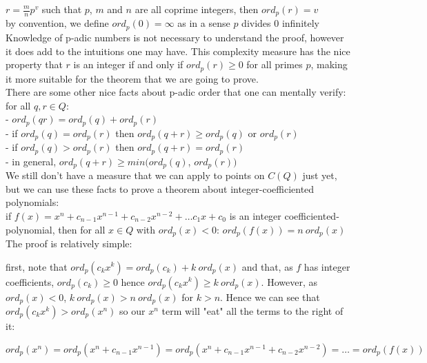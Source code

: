 \documentclass{article}
\begin{document}
$r = \frac{m}{n}p^v$ such that $p$, $m$ and $n$ are all coprime integers, then $ord_p(r) = v$\\

by convention, we define $ord_p(0) = \infty$ as in a sense $p$ divides $0$ infinitely\\

Knowledge of p-adic numbers is not necessary to understand the proof, however it does add to the intuitions one may have. This complexity measure has the nice property that $r$ is an integer if and only if $ord_p(r) \geq 0$ for all primes $p$, making it more suitable for the theorem that we are going to prove. \\

There are some other nice facts about p-adic order that one can mentally verify:\\

for all $q, r \in Q$:\\

- $ord_p(qr) = ord_p(q) + ord_p(r)$\\

- if $ord_p(q) = ord_p(r)$ then $ord_p(q + r)  \geq ord_p(q)$ or $ord_p(r)$\\

- if $ord_p(q) > ord_p(r)$ then $ord_p(q + r) = ord_p(r)$\\

- in general, $ord_p(q + r) \geq min(ord_p(q)$, $ord_p(r))$\\

We still don't have a measure that we can apply to points on $C(Q)$ just yet, but we can use these facts to prove a theorem about integer-coefficiented polynomials:\\

if $f(x) = x^n + c_{n-1}x^{n-1} + c_{n-2}x^{n-2} + \dots c_1 x + c_0$ is an integer coefficiented-polynomial, then for all $x \in Q$ with $ord_p(x) < 0$: $ord_p(f(x)) = n \ ord_p(x)$\\

The proof is relatively simple:

first, note that $ord_p(c_k x^k) = ord_p(c_k) + k \ ord_p(x)$ and that, as $f$ has integer coefficients, $ord_p(c_k) \geq 0$ hence $ord_p(c_k x^k) \geq k \ ord_p(x)$. However, as $ord_p(x) < 0$, $k \ ord_p(x) > n \ ord_p(x)$ for $k > n$. Hence we can see that $ord_p(c_k x^k) > ord_p(x^n)$ so our $x^n$ term will "eat" all the terms to the right of it:

\[ ord_p(x^n) = ord_p(x^n + c_{n-1}x^{n-1}) = ord_p(x^n + c_{n-1}x^{n-1} + c_{n-2}x^{n-2}) = \dots = ord_p(f(x)) \]
\end{document}
